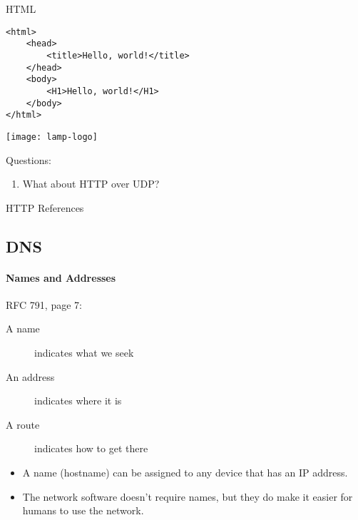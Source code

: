 \begin{frame}[fragile]{HTML}
  \begin{verbatim}
<html>
    <head>
        <title>Hello, world!</title>
    </head>
    <body>
        <H1>Hello, world!</H1>
    </body>
</html>
  \end{verbatim}
\end{frame}

\begin{frame}{\texttt{[image: lamp-logo]}}
  \centering
  \mode<beamer>{ \texttt{[image: lamp]} }%
\end{frame}

Questions:
\begin{enumerate}
\item What about HTTP over UDP?
\end{enumerate}

\begin{frame}[allowframebreaks]{HTTP References}
  \begin{refsection}
    \nocite{wiki:http, wiki:httptwo, wiki:cookie, wiki:stateless, wiki:html, wiki:lamp,
      rfc2616, rfc7540, rfc7541}
    \printbibliography[heading=none]
  \end{refsection}
\end{frame}

\subsection{DNS}

\begin{frame}\framesubtitle{Names and Addresses}
  \begin{iblock}{RFC 791, page 7:}
    \begin{description}
    \item[A name] indicates what we seek
    \item[An address] indicates where it is
    \item[A route] indicates how to get there
    \end{description}
  \end{iblock}
  \begin{itemize}
  \item A name (hostname) can be assigned to any device that has an IP address.
  \item The network software doesn't require names, but they do make it easier for humans
    to use the network.
  \end{itemize}
\end{frame}

